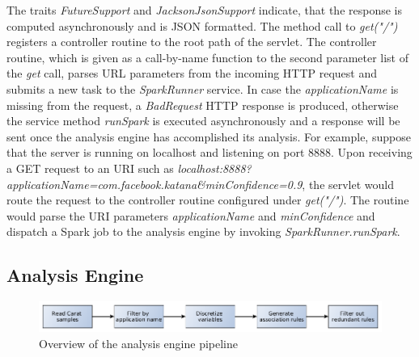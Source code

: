 The traits \textit{FutureSupport} and \textit{JacksonJsonSupport} indicate, that the response is computed asynchronously and is JSON formatted. The method call to \textit{get("/")} registers a controller routine to the root path of the servlet. The controller routine, which is given as a call-by-name function to the second parameter list of the \textit{get} call, parses URL parameters from the incoming HTTP request and submits a new task to the \textit{SparkRunner} service. In case the \textit{applicationName} is missing from the request, a \textit{BadRequest} HTTP response is produced, otherwise the service method \textit{runSpark} is executed asynchronously and a response will be sent once the analysis engine has accomplished its analysis. For example, suppose that the server is running on localhost and listening on port 8888. Upon receiving a GET request to an URI such as \textit{localhost:8888?applicationName=com.facebook.katana\&minConfidence=0.9}, the servlet would route the request to the controller routine configured under \textit{get("/")}. The routine would parse the URI parameters \textit{applicationName} and \textit{minConfidence} and dispatch a Spark job to the analysis engine by invoking \textit{SparkRunner.runSpark}.  



\subsection{Analysis Engine}


\begin{figure}
	\centering
	\includegraphics[width=\textwidth]{images/analysis_engine_flow_graph_horizontal.png}
	\caption{Overview of the analysis engine pipeline}
	\label{figure:analysis-engine-flow-graph}
\end{figure}



